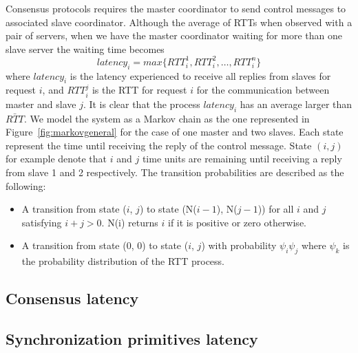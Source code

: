 Consensus protocols requires the master coordinator to send control messages to associated slave coordinator. Although the average of RTTs when observed with a pair of servers, when we have the master coordinator waiting for more than one slave server the waiting time becomes
\begin{equation}
latency_i = max \{ RTT_i^1, RTT_i^2, \ldots, RTT_i^n \}
\end{equation}
where $latency_i$ is the latency experienced to receive all replies from slaves for request $i$, and $RTT_i^j$ is the RTT for request $i$ for the communication between master and slave $j$. It is clear that the process $latency_i$ has an average larger than $\bar{RTT}$. We model the system as a Markov chain as the one represented in Figure~\ref{fig:markovgeneral} for the case of one master and two slaves. Each state represent the time until receiving the reply of the control message. State $(i, j)$ for example denote that $i$ and $j$ time units are remaining until receiving a reply from slave 1 and 2 respectively. The transition probabilities are described as the following:
\begin{itemize}
\item{A transition from state ($i$, $j$) to state (N($i-1$), N($j-1$)) for all $i$ and $j$ satisfying $i + j > 0$. N(i) returns $i$ if it is positive or zero otherwise.}
\item{A transition from state (0, 0) to state ($i$, $j$) with probability $\psi_i\psi_j$ where $\psi_k$ is the probability distribution of the RTT process.} 
\end{itemize}



\subsection{Consensus latency}

\subsection{Synchronization primitives latency}














